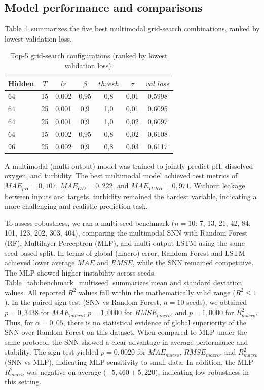 \subsection{Model performance and comparisons}
Table~\ref{tab:grid_top5} summarizes the five best multimodal grid-search combinations,
ranked by lowest validation loss.

\begin{table}[ht!]
\centering
\caption{Top-5 grid-search configurations (ranked by lowest validation loss).}
\begin{tabular}{lcccccc}
\toprule
Hidden & $T$ & $lr$ & $\beta$ & $thresh$ & $\sigma$ & $val\_loss$ \\
\midrule
64 & 15 & 0{,}002 & 0{,}95 & 0{,}8 & 0{,}01 & 0{,}5998 \\
64 & 25 & 0{,}001 & 0{,}9  & 1{,}0 & 0{,}01 & 0{,}6095 \\
64 & 25 & 0{,}001 & 0{,}9  & 1{,}0 & 0{,}02 & 0{,}6097 \\
64 & 15 & 0{,}002 & 0{,}95 & 0{,}8 & 0{,}02 & 0{,}6108 \\
96 & 25 & 0{,}002 & 0{,}9  & 0{,}8 & 0{,}03 & 0{,}6117 \\
\bottomrule
\end{tabular}
\label{tab:grid_top5}
\end{table}

A multimodal (multi-output) model was trained to jointly predict pH, dissolved oxygen,
and turbidity. The best multimodal model achieved test metrics of $MAE_{pH}=0{,}107$,
$MAE_{OD}=0{,}222$, and $MAE_{TURB}=0{,}971$. Without leakage between inputs and targets,
turbidity remained the hardest variable, indicating a more challenging and realistic
prediction task.

To assess robustness, we ran a multi-seed benchmark
($n=10$: 7, 13, 21, 42, 84, 101, 123, 202, 303, 404), comparing the multimodal SNN
with Random Forest (RF), Multilayer Perceptron (MLP), and multi-output LSTM using the
same seed-based split. In terms of global (macro) error, Random Forest and LSTM achieved
lower average $MAE$ and $RMSE$, while the SNN remained competitive. The MLP showed higher
instability across seeds. Table~\ref{tab:benchmark_multiseed} summarizes mean and standard
deviation values. All reported $R^2$ values fall within the mathematically valid range
($R^2 \leq 1$). In the paired sign test (SNN vs Random Forest, $n=10$ seeds), we obtained
$p=0{,}3438$ for $MAE_{macro}$, $p=1{,}0000$ for $RMSE_{macro}$, and $p=1{,}0000$ for
$R^2_{macro}$. Thus, for $\alpha=0{,}05$, there is no statistical evidence of global
superiority of the SNN over Random Forest on this dataset. When compared to MLP under
the same protocol, the SNN showed a clear advantage in average performance and stability.
The sign test yielded $p=0{,}0020$ for $MAE_{macro}$, $RMSE_{macro}$, and $R^2_{macro}$
(SNN vs MLP), indicating MLP sensitivity to small data. In addition, the MLP $R^2_{macro}$
was negative on average ($-5{,}460 \pm 5{,}220$), indicating low robustness in this setting.


